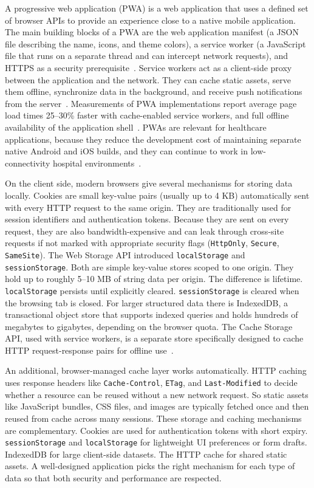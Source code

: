 A progressive web application (PWA) is a web application that uses a defined set of browser APIs to provide an experience close to a native mobile application. The main building blocks of a PWA are the web application manifest (a JSON file describing the name, icons, and theme colors), a service worker (a JavaScript file that runs on a separate thread and can intercept network requests), and HTTPS as a security prerequisite~\cite{muawwal2024pwa, popa2022pwa_health}. Service workers act as a client-side proxy between the application and the network. They can cache static assets, serve them offline, synchronize data in the background, and receive push notifications from the server~\cite{mdn_service_workers, webdev_service_workers}. Measurements of PWA implementations report average page load times 25--30\% faster with cache-enabled service workers, and full offline availability of the application shell~\cite{muawwal2024pwa}. PWAs are relevant for healthcare applications, because they reduce the development cost of maintaining separate native Android and iOS builds, and they can continue to work in low-connectivity hospital environments~\cite{popa2022pwa_health}.

On the client side, modern browsers give several mechanisms for storing data locally. Cookies are small key-value pairs (usually up to 4 KB) automatically sent with every HTTP request to the same origin. They are traditionally used for session identifiers and authentication tokens. Because they are sent on every request, they are also bandwidth-expensive and can leak through cross-site requests if not marked with appropriate security flags (\texttt{HttpOnly}, \texttt{Secure}, \texttt{SameSite}). The Web Storage API introduced \texttt{localStorage} and \texttt{sessionStorage}. Both are simple key-value stores scoped to one origin. They hold up to roughly 5--10 MB of string data per origin. The difference is lifetime. \texttt{localStorage} persists until explicitly cleared. \texttt{sessionStorage} is cleared when the browsing tab is closed. For larger structured data there is IndexedDB, a transactional object store that supports indexed queries and holds hundreds of megabytes to gigabytes, depending on the browser quota. The Cache Storage API, used with service workers, is a separate store specifically designed to cache HTTP request-response pairs for offline use~\cite{mdn_service_workers, webdev_service_workers}.

An additional, browser-managed cache layer works automatically. HTTP caching uses response headers like \texttt{Cache-Control}, \texttt{ETag}, and \texttt{Last-Modified} to decide whether a resource can be reused without a new network request. So static assets like JavaScript bundles, CSS files, and images are typically fetched once and then reused from cache across many sessions. These storage and caching mechanisms are complementary. Cookies are used for authentication tokens with short expiry. \texttt{sessionStorage} and \texttt{localStorage} for lightweight UI preferences or form drafts. IndexedDB for large client-side datasets. The HTTP cache for shared static assets. A well-designed application picks the right mechanism for each type of data so that both security and performance are respected.

